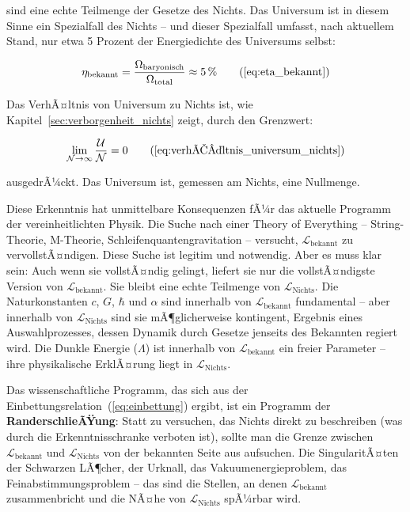 ﻿\documentclass[12pt,a4paper]{report}
\begin{document}
sind eine echte Teilmenge der Gesetze des Nichts. Das Universum ist in diesem Sinne ein Spezialfall des Nichts -- und dieser Spezialfall umfasst, nach aktuellem Stand, nur etwa 5 Prozent der Energiedichte des Universums selbst:

\begin{equation}
	\eta_{\text{bekannt}} = \frac{\Omega_{\text{baryonisch}}}{\Omega_{\text{total}}} \approx 5\,\%
	\tag{\ref{eq:eta_bekannt}}
\end{equation}

Das VerhÃ¤ltnis von Universum zu Nichts ist, wie Kapitel~\ref{sec:verborgenheit_nichts} zeigt, durch den Grenzwert:

\begin{equation}
	\lim_{\mathcal{N} \to \infty} \frac{\mathcal{U}}{\mathcal{N}} = 0
	\tag{\ref{eq:verhÃ¤ltnis_universum_nichts}}
\end{equation}

ausgedrÃ¼ckt. Das Universum ist, gemessen am Nichts, eine Nullmenge.

Diese Erkenntnis hat unmittelbare Konsequenzen fÃ¼r das aktuelle Programm der vereinheitlichten Physik. Die Suche nach einer \glqq Theory of Everything\grqq{} -- String-Theorie, M-Theorie, Schleifenquantengravitation -- versucht, $\mathcal{L}_{\text{bekannt}}$ zu vervollstÃ¤ndigen. Diese Suche ist legitim und notwendig. Aber es muss klar sein: Auch wenn sie vollstÃ¤ndig gelingt, liefert sie nur die vollstÃ¤ndigste Version von $\mathcal{L}_{\text{bekannt}}$. Sie bleibt eine echte Teilmenge von $\mathcal{L}_{\text{Nichts}}$. Die Naturkonstanten $c$, $G$, $\hbar$ und $\alpha$ sind innerhalb von $\mathcal{L}_{\text{bekannt}}$ fundamental -- aber innerhalb von $\mathcal{L}_{\text{Nichts}}$ sind sie mÃ¶glicherweise kontingent, Ergebnis eines Auswahlprozesses, dessen Dynamik durch Gesetze jenseits des Bekannten regiert wird. Die Dunkle Energie ($\Lambda$) ist innerhalb von $\mathcal{L}_{\text{bekannt}}$ ein freier Parameter -- ihre physikalische ErklÃ¤rung liegt in $\mathcal{L}_{\text{Nichts}}$.

Das wissenschaftliche Programm, das sich aus der Einbettungsrelation~(\ref{eq:einbettung}) ergibt, ist ein Programm der \textbf{RanderschlieÃŸung}: Statt zu versuchen, das Nichts direkt zu beschreiben (was durch die Erkenntnisschranke verboten ist), sollte man die Grenze zwischen $\mathcal{L}_{\text{bekannt}}$ und $\mathcal{L}_{\text{Nichts}}$ von der bekannten Seite aus aufsuchen. Die SingularitÃ¤ten der Schwarzen LÃ¶cher, der Urknall, das Vakuumenergieproblem, das Feinabstimmungsproblem -- das sind die Stellen, an denen $\mathcal{L}_{\text{bekannt}}$ zusammenbricht und die NÃ¤he von $\mathcal{L}_{\text{Nichts}}$ spÃ¼rbar wird.
\end{document}
